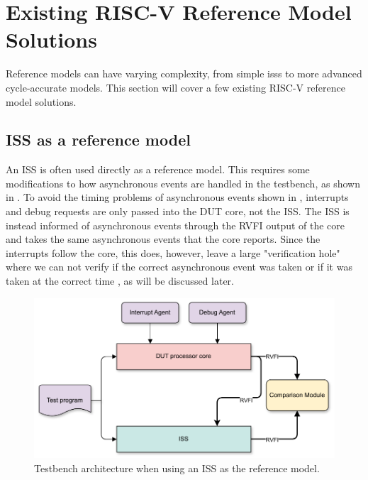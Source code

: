 \section{Existing RISC-V Reference Model Solutions}
\label{sec:bg_existingReference}

Reference models can have varying complexity, from simple  \acrshort{iss}s to more advanced cycle-accurate models. This section will cover a few existing RISC-V reference model solutions.

\subsection{ISS as a reference model}
\label{sec:bg_iss_refmod}

An ISS is often used directly as a reference model. This requires some modifications to how asynchronous events are handled in the testbench, as shown in . To avoid the timing problems of asynchronous events shown in , interrupts and debug requests are only passed into the DUT core, not the ISS. The ISS is instead informed of asynchronous events through the RVFI output of the core and takes the same asynchronous events that the core reports. Since the interrupts follow the core, this does, however, leave a large "verification hole" where we can not verify if the correct asynchronous event was taken or if it was taken at the correct time \cite{taylorAdvancedRISCVVerification2023}, as will be discussed later. 

\begin{figure}
    \centering
    \includegraphics[width=0.75\linewidth]{figures/ISS_architecture.pdf}
    \caption{Testbench architecture when using an ISS as the reference model.}
    \label{fig:iss_testbench}
\end{figure}
%

